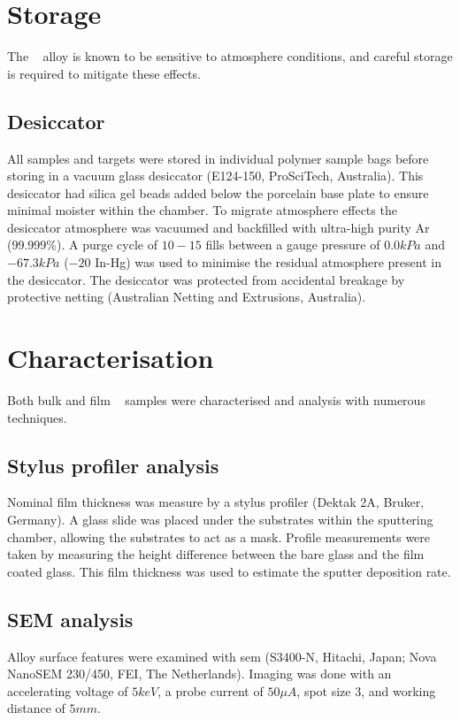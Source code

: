 \documentclass[a4paper,12pt,oneside]{report}%
\begin{document}
\section{Storage}
The \MgZnCa~ alloy is known to be sensitive to atmosphere conditions, and careful storage is required to mitigate these effects. 

\subsection{Desiccator}
All samples and targets were stored in individual polymer sample bags before storing in a vacuum glass desiccator (E124-150, ProSciTech, Australia). This desiccator had silica gel beads added below the porcelain base plate to ensure minimal moister within the chamber. To migrate atmosphere effects the desiccator atmosphere was vacuumed and backfilled with ultra-high purity Ar (99.999\%). A purge cycle of $10 - 15$ fills between a gauge pressure of $0.0 kPa$ and $-67.3 kPa$ ($-20$ In-Hg) was used to minimise the residual atmosphere present in the desiccator. The desiccator was protected from accidental breakage by protective netting (Australian Netting and Extrusions, Australia).

\section{Characterisation}
Both bulk and film \MgZnCa~ samples were characterised and analysis with numerous techniques. 

\subsection{Stylus profiler analysis}
Nominal film thickness was measure by a stylus profiler (Dektak 2A, Bruker, Germany). A glass slide was placed under the substrates within the sputtering chamber, allowing the substrates to act as a mask. Profile measurements were taken by measuring the height difference between the bare glass and the film coated glass. This film thickness was used to estimate the sputter deposition rate.  

\subsection{SEM analysis}
Alloy surface features were examined with \gls{sem} (S3400-N, Hitachi, Japan; Nova NanoSEM 230/450, FEI, The Netherlands). Imaging was done with an accelerating voltage of $5keV$, a probe current of $50 \mu A$, spot size 3, and working distance of $5mm$.
\end{document}
